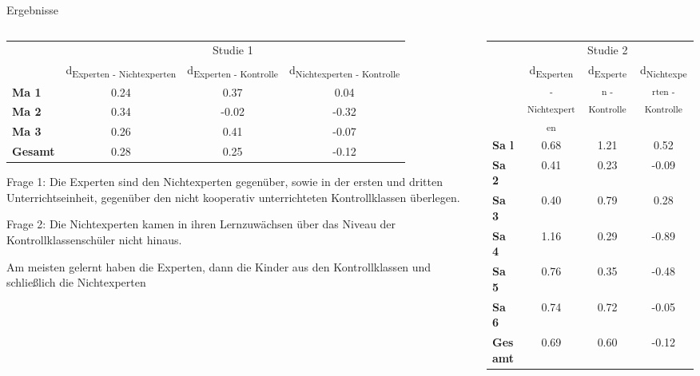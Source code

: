\begin{block}{Ergebnisse} %
\begin{columns}[t,totalwidth=\twocolwid] %

\begin{column}{\onecolwid}
\begin{table}
\begin{tabular}{lccc}
 & \multicolumn{3}{c}{Studie 1} \\
\cmidrule{2-4}
 & d\textsubscript{Experten - Nichtexperten} & d\textsubscript{Experten - Kontrolle} & d\textsubscript{Nichtexperten - Kontrolle} \\
\midrule 
\textbf{Ma 1} & 0.24 & 0.37 & 0.04 \\
\textbf{Ma 2} & 0.34 & -0.02 & -0.32 \\
\textbf{Ma 3} & 0.26 & 0.41 & -0.07 \\
\midrule 
\textbf{Gesamt} & 0.28 & 0.25 & -0.12 \\
\bottomrule
\end{tabular}
\end{table}

\justifying 
Frage 1: Die Experten sind  den Nichtexperten gegenüber, sowie in der ersten und dritten Unterrichtseinheit, gegenüber den nicht kooperativ unterrichteten Kontrollklassen überlegen.
 
Frage 2: Die Nichtexperten kamen in ihren Lernzuwächsen über das Niveau 
der Kontrollklassenschüler nicht hinaus.

Am meisten gelernt haben die Experten, dann die Kinder aus den Kontrollklassen und schließlich die Nichtexperten
 
\end{column}

\begin{column}{\onecolwid}
\begin{table}
\begin{tabular}{lccc}
 & \multicolumn{3}{c}{Studie 2} \\
\cmidrule{2-4}
 & d\textsubscript{Experten - Nichtexperten} & d\textsubscript{Experten - Kontrolle} & d\textsubscript{Nichtexperten - Kontrolle} \\
\midrule 
\textbf{Sa l} & 0.68 & 1.21 & 0.52 \\
\textbf{Sa 2} & 0.41 & 0.23 & -0.09 \\
\textbf{Sa 3} & 0.40 & 0.79 & 0.28 \\
\textbf{Sa 4} & 1.16 & 0.29 & -0.89 \\
\textbf{Sa 5} & 0.76 & 0.35 & -0.48 \\
\textbf{Sa 6} & 0.74 & 0.72 & -0.05 \\
\midrule 
\textbf{Gesamt} & 0.69 & 0.60 & -0.12 \\
\bottomrule
\end{tabular} 
\end{table}


\end{column}
\end{columns}
\end{block}
